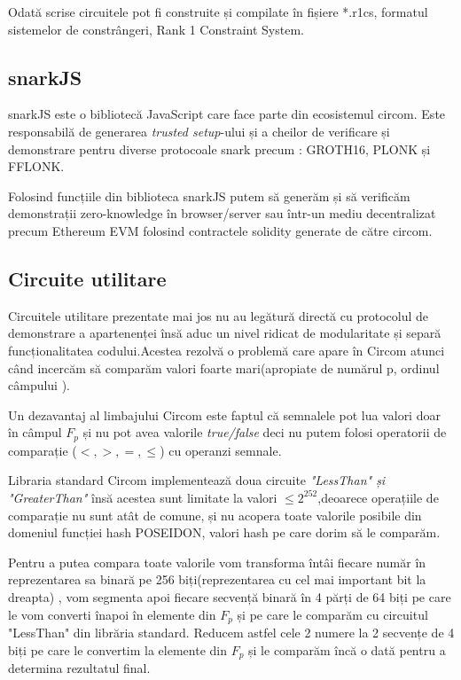 \documentclass[12pt, letterpaper]{article}
\begin{document}
Odată scrise circuitele pot fi construite și compilate în fișiere *.r1cs, formatul sistemelor de constrângeri, Rank 1 Constraint System.

\subsection{snarkJS}

snarkJS este o bibliotecă JavaScript care face parte din ecosistemul circom. Este responsabilă de generarea \emph{trusted setup}-ului și a cheilor de verificare și demonstrare pentru diverse protocoale snark precum : GROTH16, PLONK și FFLONK.

Folosind funcțiile din biblioteca snarkJS putem să generăm și să verificăm demonstrații zero-knowledge în browser/server sau într-un mediu decentralizat precum Ethereum EVM folosind contractele solidity generate de către circom.

\pagebreak
\subsection{Circuite utilitare}

Circuitele utilitare prezentate mai jos nu au legătură directă cu protocolul de demonstrare a apartenenței însă aduc un nivel ridicat de modularitate și separă funcționalitatea codului.Acestea rezolvă o problemă care apare în Circom atunci când incercăm să comparăm valori foarte mari(apropiate de numărul p, ordinul câmpului ).

Un dezavantaj al limbajului Circom este faptul că semnalele pot lua valori doar în câmpul $F_p$ și nu pot avea valorile \emph{true/false} deci nu putem folosi operatorii de comparație ($<,>,=,\leq$) cu operanzi semnale. 

Libraria standard Circom implementează doua circuite \emph{"LessThan" și "GreaterThan"} însă acestea sunt limitate la valori $\leq2^{252}$,deoarece operațiile de comparație nu sunt atât de comune, și nu acopera toate valorile posibile din domeniul funcției hash POSEIDON, valori hash pe care dorim să le comparăm.

Pentru a putea compara toate valorile vom transforma întâi fiecare număr în reprezentarea sa binară pe 256 biți(reprezentarea cu cel mai important bit la dreapta) , vom segmenta apoi fiecare secvență binară în 4 părți de 64 biți pe care le vom converti înapoi în elemente din $F_p$ și pe care le comparăm cu circuitul "LessThan" din librăria standard. Reducem astfel cele 2 numere la 2 secvențe de 4 biți pe care le convertim la elemente din $F_p$ și le comparăm încă o dată pentru a determina rezultatul final. 
\end{document}

